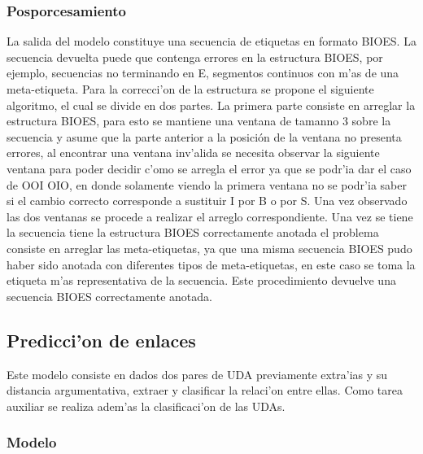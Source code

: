 \subsubsection{Posporcesamiento}

La salida del modelo constituye una secuencia de etiquetas en formato BIOES. La secuencia devuelta puede que contenga
errores en la estructura BIOES, por ejemplo, secuencias no terminando en E, segmentos continuos con m'as de una meta-etiqueta.
Para la correcci'on de la estructura se propone el siguiente algoritmo, el cual se divide en dos partes. La primera
parte consiste en arreglar la estructura BIOES, para esto se mantiene una ventana de tamanno
3 sobre la secuencia y asume que la parte anterior a la posición de la ventana no presenta errores, al encontrar una
ventana inv'alida se necesita observar la siguiente ventana para poder decidir c'omo se arregla el error ya que se
podr'ia dar el caso de OOI OIO, en donde solamente viendo la primera ventana no se podr'ia saber si el cambio 
correcto corresponde a sustituir I por B o por S. Una vez observado las dos ventanas se procede a realizar el 
arreglo correspondiente. Una vez se tiene la secuencia tiene la estructura BIOES correctamente anotada el problema
consiste en arreglar las meta-etiquetas, ya que una misma secuencia BIOES pudo haber sido anotada con diferentes
tipos de meta-etiquetas, en este caso se toma la etiqueta m'as representativa de la secuencia. Este procedimiento
devuelve una secuencia BIOES correctamente anotada.

\subsection{Predicci'on de enlaces}

Este modelo consiste en dados dos pares de UDA previamente extra'ias y su distancia argumentativa, 
extraer y clasificar la relaci'on entre ellas. Como tarea auxiliar se realiza adem'as la clasificaci'on 
de las UDAs.

\subsubsection{Modelo}


